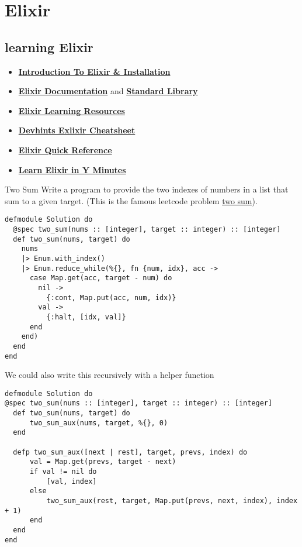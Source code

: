 \chapter{Elixir}

\section{learning Elixir}
\begin{itemize}
    \item \textbf{\href{https://elixir-lang.org/getting-started/introduction.html}{Introduction To Elixir \& Installation}}
    \item \textbf{\href{https://elixir-lang.org/docs.html}{Elixir Documentation}} and \textbf{\href{https://hexdocs.pm/elixir/Kernel.html}{Standard Library}}
    \item \textbf{\href{https://elixir-lang.org/learning.html}{Elixir Learning Resources}}
    \item \textbf{\href{https://devhints.io/elixir}{Devhints Exlixir Cheatsheet}}
    \item \textbf{\href{https://github.com/itsgreggreg/elixir_quick_reference}{Elixir Quick Reference}}
    \item \textbf{\href{https://learnxinyminutes.com/docs/elixir/}{Learn Elixir in Y Minutes}}
\end{itemize}

\begin{examplebox}{Two Sum}
    Write a program to provide the two indexes of numbers in a list that sum to a given target.
    (This is the famous leetcode problem \href{https://leetcode.com/problems/two-sum/}{two sum}).
    \tcblower
    \begin{verbatim}
defmodule Solution do
  @spec two_sum(nums :: [integer], target :: integer) :: [integer]
  def two_sum(nums, target) do
    nums
    |> Enum.with_index()
    |> Enum.reduce_while(%{}, fn {num, idx}, acc ->
      case Map.get(acc, target - num) do
        nil ->
          {:cont, Map.put(acc, num, idx)}
        val ->
          {:halt, [idx, val]}
      end
    end)
  end
end
    \end{verbatim}
    We could also write this recursively with a helper function
    \begin{verbatim}
defmodule Solution do
@spec two_sum(nums :: [integer], target :: integer) :: [integer]
  def two_sum(nums, target) do
      two_sum_aux(nums, target, %{}, 0)
  end

  defp two_sum_aux([next | rest], target, prevs, index) do
      val = Map.get(prevs, target - next)
      if val != nil do
          [val, index]
      else
          two_sum_aux(rest, target, Map.put(prevs, next, index), index + 1)
      end
  end
end
    \end{verbatim}
\end{examplebox}


